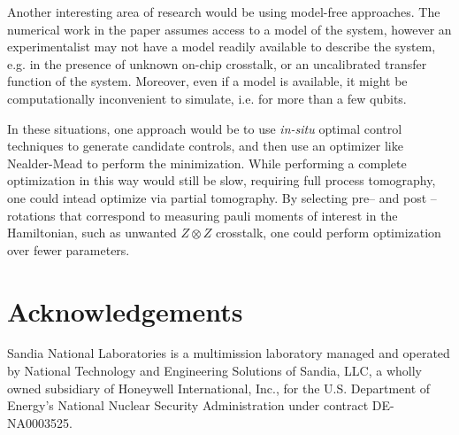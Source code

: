\documentclass[aps,nofootinbib,pra,notitlepage,twocolumn]{revtex4-1}
\begin{document}
Another interesting area of research would be using model-free approaches. The numerical work in the paper assumes access to a model of the system, however an experimentalist may not have a model readily available to describe the system, e.g. in the presence of unknown on-chip crosstalk, or an uncalibrated transfer function of the system. Moreover, even if a model is available, it might be computationally inconvenient to simulate, i.e. for more than a few qubits.%

In these situations, one approach would be to use \textit{in-situ} optimal control techniques \cite{Wu2018, Kelly2014, Ferrie2015} to generate candidate controls, and then use an optimizer like Nealder-Mead to perform the minimization. While performing a complete optimization in this way would still be slow, requiring full process tomography, one could intead optimize via partial tomography. By selecting pre-- and post --rotations that correspond to measuring pauli moments of interest in the Hamiltonian, such as unwanted $Z\otimes Z$ crosstalk, one could perform optimization over fewer parameters.

\section{Acknowledgements}
Sandia National Laboratories is a multimission laboratory managed and operated by National Technology and Engineering Solutions of Sandia, LLC, a wholly owned subsidiary of Honeywell International, Inc., for the U.S. Department of Energy's National Nuclear Security Administration under contract DE-NA0003525.

\end{document}
